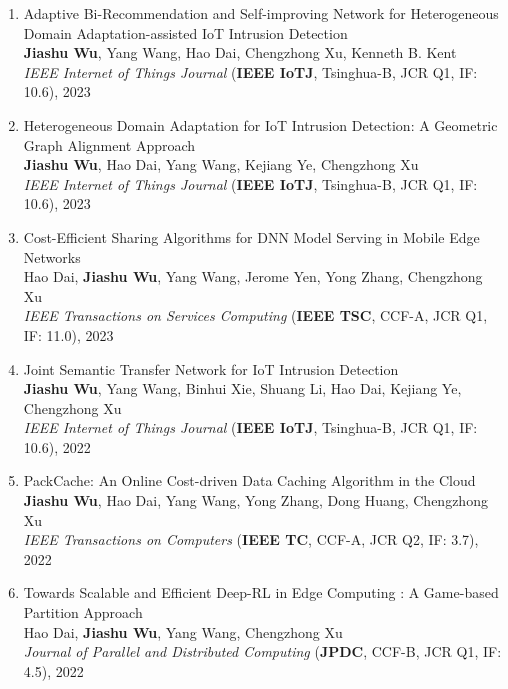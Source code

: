 \documentclass[letterpaper,11pt]{article}
\begin{document}
\begin{enumerate}
  \item Adaptive Bi-Recommendation and Self-improving Network for Heterogeneous Domain Adaptation-assisted IoT Intrusion Detection\\
  \textbf{Jiashu Wu}, Yang Wang\textsuperscript{\Letter}, Hao Dai, Chengzhong Xu, Kenneth B. Kent\\
  \textit{IEEE Internet of Things Journal} (\textbf{IEEE IoTJ}, Tsinghua-B, JCR Q1, IF: 10.6), 2023

  \item Heterogeneous Domain Adaptation for IoT Intrusion Detection: A Geometric Graph Alignment Approach\\
  \textbf{Jiashu Wu}, Hao Dai, Yang Wang\textsuperscript{\Letter}, Kejiang Ye, Chengzhong Xu\\
  \textit{IEEE Internet of Things Journal} (\textbf{IEEE IoTJ}, Tsinghua-B, JCR Q1, IF: 10.6), 2023

  \item Cost-Efficient Sharing Algorithms for DNN Model Serving in Mobile Edge Networks\\
  Hao Dai, \textbf{Jiashu Wu}, Yang Wang\textsuperscript{\Letter}, Jerome Yen, Yong Zhang, Chengzhong Xu\\
  \textit{IEEE Transactions on Services Computing} (\textbf{IEEE TSC}, CCF-A, JCR Q1, IF: 11.0), 2023

  \item Joint Semantic Transfer Network for IoT Intrusion Detection\\
  \textbf{Jiashu Wu}, Yang Wang\textsuperscript{\Letter}, Binhui Xie, Shuang Li, Hao Dai, Kejiang Ye, Chengzhong Xu\\
  \textit{IEEE Internet of Things Journal} (\textbf{IEEE IoTJ}, Tsinghua-B, JCR Q1, IF: 10.6), 2022

  \item PackCache: An Online Cost-driven Data Caching Algorithm in the Cloud\\
  \textbf{Jiashu Wu}, Hao Dai, Yang Wang\textsuperscript{\Letter}, Yong Zhang, Dong Huang, Chengzhong Xu\\
  \textit{IEEE Transactions on Computers} (\textbf{IEEE TC}, CCF-A, JCR Q2, IF: 3.7), 2022

  \item Towards Scalable and Efficient Deep-RL in Edge Computing : A Game-based Partition Approach\\
  Hao Dai, \textbf{Jiashu Wu}, Yang Wang\textsuperscript{\Letter}, Chengzhong Xu\\
  \textit{Journal of Parallel and Distributed Computing} (\textbf{JPDC}, CCF-B, JCR Q1, IF: 4.5), 2022


\end{enumerate}
\end{document}
